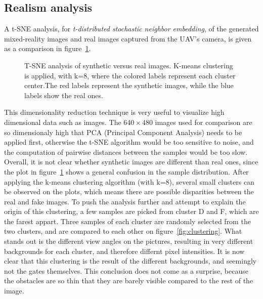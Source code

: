 \clearpage
\subsection{Realism analysis}

A t-SNE analysis, for \emph{t-distributed stochastic neighbor embedding}, of
the generated mixed-reality images and real images captured from the UAV's
camera, is given as a comparison in figure~\ref{fig:tsne}.

\begin{figure}[h!]
   \centering
   \scalebox{0.8}{
      
   }
   \caption[T-SNE analysis of synthetic versus real images.]{T-SNE analysis of
      synthetic versus real images. K-means clustering is applied, with k=8,
      where the colored labels represent each cluster center.The red labels
   represent the synthetic images, while the blue labels show the real ones.}
   \label{fig:tsne}
\end{figure}

This dimensionality reduction technique is very useful to visualize high
dimensional data such as images. The $640 \times 480$ images used for
comparison are so dimensionaly high that PCA (Principal Component Analysis)
needs to be applied first, otherwise the t-SNE algorithm would be too sensitive
to noise, and the computation of pairwise distances between the samples would
be too slow.\\

Overall, it is not clear whether synthetic images are different than real ones,
since the plot in figure~\ref{fig:tsne} shows a general confusion in the
sample distribution. After applying the k-means clustering algorithm (with
k=8), several small clusters can be observed on the plots, which means there
are possible disparities between the real and fake images. To push the analysis
further and attempt to explain the origin of this clustering, a few samples are
picked from cluster D and F, which are the farest appart. Three samples of each
cluster are randomly selected from the two clusters, and are compared to each
other on figure~\ref{fig:clustering}. What stands out is the different view
angles on the pictures, resulting in very different backgrounds for each
cluster, and therefore differnt pixel intensities. It is now clear that this
clustering is the result of the different backgrounds, and seemingly not the
gates themselves. This conclusion does not come as a surprise, because the
obstacles are so thin that they are barely visible compared to the rest of the
image.

